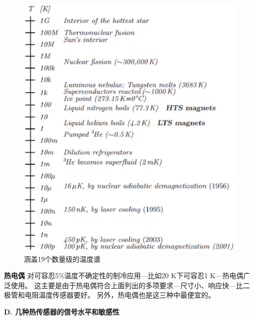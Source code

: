 \begin{figure}[htbp]
	\centering
	\includegraphics[scale=0.7]{chpt4/figs/fig4.19.eps}
	\caption{涵盖19个数量级的温度谱}
\end{figure}

\textbf{热电偶} 对可容忍5\%温度不确定性的制冷应用---比如20 K下可容忍1 K---热电偶广泛使用。
这主要是由于热电偶符合上面列出的多项要求---尺寸小、响应快---比二极管和电阻温度传感器要好。
另外，热电偶也是这三种中最便宜的。

\textbf{D. 几种热传感器的信号水平和敏感性}

